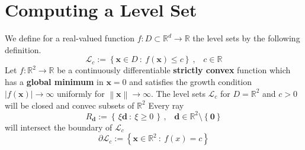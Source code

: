 \documentclass{article}
\begin{document}
\section*{Computing a Level Set}
We define for a real-valued function $f : D \subset \mathbb{R}^{d} \to \mathbb{R}$ the level sets by the following definition.
\begin{equation*}
    \mathcal{L}_{c}:= \left\{\mathbf{x}\in D \: : \: f\left(\mathbf{x}\right) \leq c\right\} \: \text{,} \quad c \in \mathbb{R}
\end{equation*}
Let $f : \mathbb{R}^{2} \to \mathbb{R}$ be a continuously differentiable \textbf{strictly convex} function which has a \textbf{global minimum} in $\mathbf{x} = 0$ and satisfies the growth condition $\left\lvert f\left(\mathbf{x}\right) \right\rvert \to \infty$ uniformly for $\left\lVert \mathbf{x}\right\rVert \to \infty$.  The level sets $\mathcal{L}_{c}$ for $D = \mathbb{R}^{2}$ and $c > 0$ will be closed and convec subsets of $\mathbb{R}^{2}$ Every ray
\begin{equation*}
    R_{\mathbf{d}} := \left\{\,\xi\mathbf{d} \: : \: \xi \geq 0\,\right\}\,\text{,} \quad \mathbf{d} \in \mathbb{R}^{2} \setminus \left\{\mathbf{0}\right\}
\end{equation*}
will intersect the boundary of $\mathcal{L}_{c}$
\begin{equation*}
    \partial \mathcal{L}_{c} := \left\{\mathbf{x} \in \mathbb{R}^{2} \: : \: f\left(x\right) = c\right\}
\end{equation*}
\end{document}
